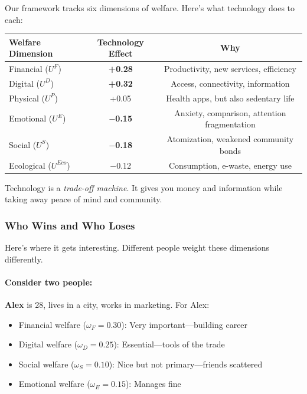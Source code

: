 Our framework tracks six dimensions of welfare. Here's what technology 
does to each:

\begin{center}
\renewcommand{\arraystretch}{1.4}
\begin{tabular}{lcc}
\hline
\textbf{Welfare Dimension} & \textbf{Technology Effect} & \textbf{Why} \\
\hline
Financial ($U^F$) & \textcolor{green!60!black}{\textbf{+0.28}} & Productivity, new services, efficiency \\
Digital ($U^D$) & \textcolor{green!60!black}{\textbf{+0.32}} & Access, connectivity, information \\
Physical ($U^P$) & \textcolor{green!60!black}{+0.05} & Health apps, but also sedentary life \\
\hline
Emotional ($U^E$) & \textcolor{red!70!black}{\textbf{$-$0.15}} & Anxiety, comparison, attention fragmentation \\
Social ($U^S$) & \textcolor{red!70!black}{\textbf{$-$0.18}} & Atomization, weakened community bonds \\
Ecological ($U^{Eco}$) & \textcolor{red!70!black}{$-$0.12} & Consumption, e-waste, energy use \\
\hline
\end{tabular}
\end{center}

Technology is a \emph{trade-off machine}. It gives you money and information 
while taking away peace of mind and community.

\subsubsection{Who Wins and Who Loses}

Here's where it gets interesting. Different people weight these dimensions differently.

\paragraph{Consider two people:}

\textbf{Alex} is 28, lives in a city, works in marketing. For Alex:
\begin{itemize}
    \item Financial welfare ($\omega_F = 0.30$): Very important---building career
    \item Digital welfare ($\omega_D = 0.25$): Essential---tools of the trade
    \item Social welfare ($\omega_S = 0.10$): Nice but not primary---friends scattered
    \item Emotional welfare ($\omega_E = 0.15$): Manages fine
\end{itemize}

